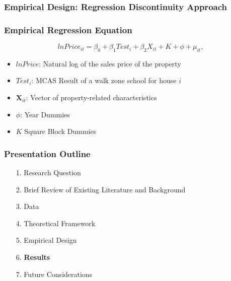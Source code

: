 \documentclass{beamer}
\begin{document}
\begin{frame}
\label{Empirical Design}
\frametitle{Empirical Design: Regression Discontinuity Approach}
\end{frame}

\begin{frame}
\label{Empirical Design}
\frametitle{Empirical Regression Equation}
\begin{equation}
\label{BasicActualEquation}
lnPrice_{it} = \beta_0 + \beta_1 Test_i + \beta_2 X_{it} + K + \phi + \mu_{it},
\end{equation}
\begin{itemize}
\item $ln Price$: Natural log of the sales price of the property
\item $Test_i$: MCAS Result of a walk zone school for house $i$
\item $\mathbf{X}_{it}$: Vector of property-related characteristics
\item $\phi$: Year Dummies
\item $K$ Square Block Dummies \newline
\end{itemize}
\end{frame}

\begin{frame}
\label{Presentation Outline 6}
\frametitle{Presentation Outline}
\begin{enumerate}
\item[1.] Research Question
\newline
\item[2.] Brief Review of Existing Literature and Background
\newline
\item[3.] Data
\newline
\item[4.] Theoretical Framework
\newline
\item[5.] Empirical Design
\newline
\item[6.] \textbf{Results}
\newline
\item[7.] Future Considerations
\end{enumerate}
\end{frame}
\end{document}
